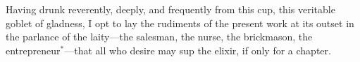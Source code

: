 Having drunk reverently, deeply, and frequently from this cup, this
veritable goblet of gladness, I opt to lay the rudiments of the
present work at its outset in the parlance of the laity---the
salesman, the nurse, the brickmason, the entrepreneur$^*$---that all
who desire may sup the elixir, if only for a chapter.



    
% 
% 

